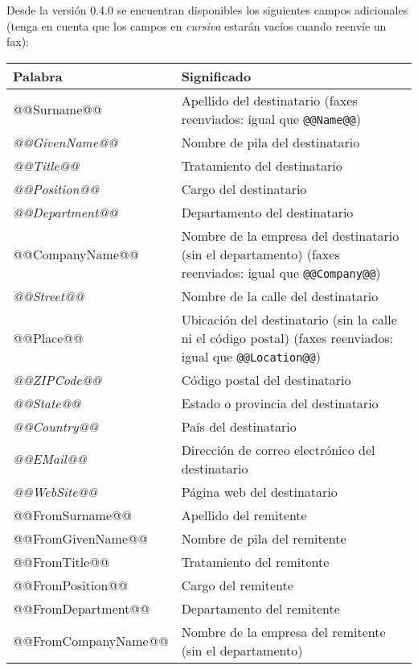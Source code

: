 \documentclass[a4paper,10pt]{scrartcl}
\begin{document}
Desde la versión 0.4.0 se encuentran disponibles los siguientes campos adicionales (tenga en cuenta que los campos en \textit{cursiva} estarán vacíos cuando reenvíe un fax):
\begin{center}
\begin{tabular}{|l|p{}|}
\hline
\bfseries Palabra & \bfseries Significado \\
\hline\hline
\ttfamily @@Surname@@ & Apellido del destinatario (faxes reenviados: igual que \texttt{@@Name@@}) \\\hline
\ttfamily\itshape @@GivenName@@ & Nombre de pila del destinatario \\\hline
\ttfamily\itshape @@Title@@ & Tratamiento del destinatario \\\hline
\ttfamily\itshape @@Position@@ & Cargo del destinatario \\\hline
\ttfamily\itshape @@Department@@ & Departamento del destinatario\\\hline
\ttfamily @@CompanyName@@ & Nombre de la empresa del destinatario (sin el departamento) (faxes reenviados: igual que \texttt{@@Company@@})\\\hline
\ttfamily\itshape @@Street@@ & Nombre de la calle del destinatario \\\hline
\ttfamily @@Place@@ & Ubicación del destinatario (sin la calle ni el código postal) (faxes reenviados: igual que \texttt{@@Location@@})\\\hline
\ttfamily\itshape @@ZIPCode@@ & Código postal del destinatario \\\hline
\ttfamily\itshape @@State@@ & Estado o provincia del destinatario\\\hline
\ttfamily\itshape @@Country@@ & País del destinatario\\\hline
\ttfamily\itshape @@EMail@@ & Dirección de correo electrónico del destinatario\\\hline
\ttfamily\itshape @@WebSite@@ & Página web del destinatario\\\hline\hline
\ttfamily @@FromSurname@@ & Apellido del remitente \\\hline
\ttfamily @@FromGivenName@@ & Nombre de pila del remitente \\\hline
\ttfamily @@FromTitle@@ & Tratamiento del remitente \\\hline
\ttfamily @@FromPosition@@ & Cargo del remitente \\\hline
\ttfamily @@FromDepartment@@ & Departamento del remitente\\\hline
\ttfamily @@FromCompanyName@@ & Nombre de la empresa del remitente (sin el departamento)\\\hline

\end{tabular}
\end{center}
\end{document}
